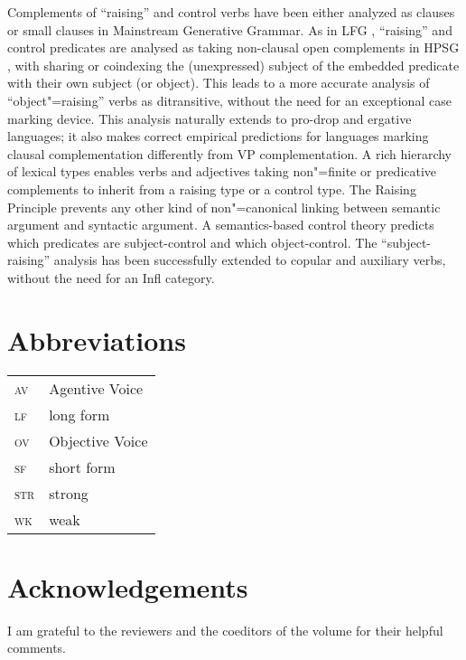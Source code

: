 Complements of ``raising'' and control verbs have been either analyzed as clauses \citep{Chomsky81a}\addpages
or small clauses \citep{Stowell81a-u,Stowell1983}\addpages in Mainstream Generative Grammar.  As in LFG
\citep{Bresnan1982}, ``raising'' and control predicates are analysed as taking non-clausal open
complements in HPSG \citep{PollardandSag1994}\addpages, with sharing or coindexing the (unexpressed) subject
of the embedded predicate with their own subject (or object). This leads to a more accurate analysis
of ``object"=raising'' verbs as ditransitive, without the need for an exceptional case marking
device. This analysis naturally extends to pro-drop and ergative languages; it also makes correct
empirical predictions for languages marking clausal complementation differently from VP
complementation. A rich hierarchy of lexical types enables verbs and adjectives taking non"=finite
or predicative complements to inherit from a raising type or a control type. The Raising Principle
prevents any other kind of non"=canonical linking between semantic argument and syntactic
argument. A semantics-based control theory predicts which predicates are subject-control and which
object-control. The ``subject-raising'' analysis has been successfully extended to copular and
auxiliary verbs, without the need for an Infl category.




\section*{Abbreviations}

\begin{tabularx}{.45\textwidth}{@{}lX}
\textsc{av} & Agentive Voice\\
\textsc{lf} & long form\\ 
\textsc{ov} & Objective Voice\\
\textsc{sf} & short form\\
\textsc{str} & strong\\
\textsc{wk} & weak\\

\end{tabularx}

\section*{Acknowledgements}

I am grateful to the reviewers and the coeditors of the volume for their helpful comments.
{\sloppy
\printbibliography[heading=subbibliography,notkeyword=this] 
}


